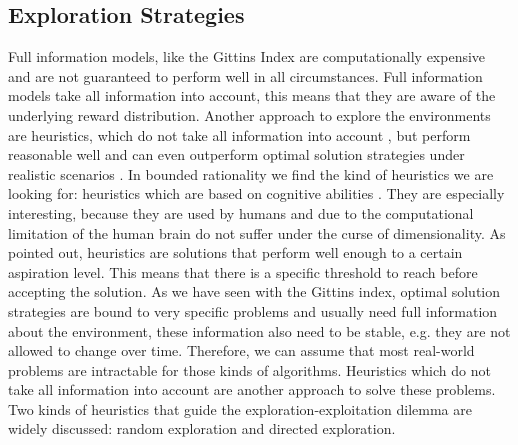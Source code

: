 \subsection{Exploration Strategies}
Full information models, like the Gittins Index are computationally expensive and are not guaranteed to perform well in all circumstances. Full information models take all information into account, this means that they are aware of the underlying reward distribution.
Another approach to explore the environments are heuristics, which do not take all information into account \citep{parpart2018heuristics}, but perform reasonable well and can even outperform optimal solution strategies under realistic scenarios \citep{gigerenzer1996reasoning, gigerenzer1999simple, katsikopoulos2010robust}.
In bounded rationality \citep{simon1956rational} we find the kind of heuristics we are looking for: heuristics which are based on cognitive abilities \citep{gigerenzer2002bounded}. They are especially interesting, because they are used by humans and due to the computational limitation of the human brain do not suffer under the curse of dimensionality.
As \cite{gigerenzer2009homo} pointed out, heuristics are solutions that perform well enough to a certain aspiration level. This means that there is a specific threshold to reach before accepting the solution. As we have seen with the Gittins index, optimal solution strategies are bound to very specific problems and usually need full information about the environment, these information also need to be stable, e.g. they are not allowed to change over time. Therefore, we can assume that most real-world problems are intractable for those kinds of algorithms. Heuristics which do not take all information into account are another approach to solve these problems. Two kinds of heuristics that guide the exploration-exploitation dilemma are widely discussed: random exploration and directed exploration.



